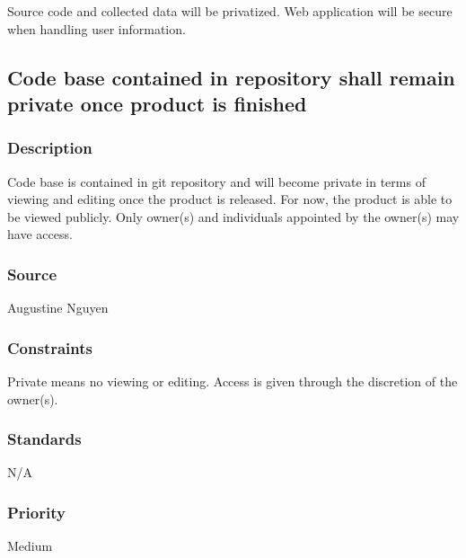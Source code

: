 Source code and collected data will be privatized.  Web application will be secure when handling user information.
\subsection{Code base contained in repository shall remain private once product is finished}
\subsubsection{Description}
Code base is contained in git repository and will become private in terms of viewing and editing once the product is released.  For now, the product is able to be viewed publicly.  Only owner(s) and individuals appointed by the owner(s) may have access.
\subsubsection{Source}
Augustine Nguyen
\subsubsection{Constraints}
Private means no viewing or editing.  Access is given through the discretion of the owner(s).
\subsubsection{Standards}
N/A
\subsubsection{Priority}
Medium